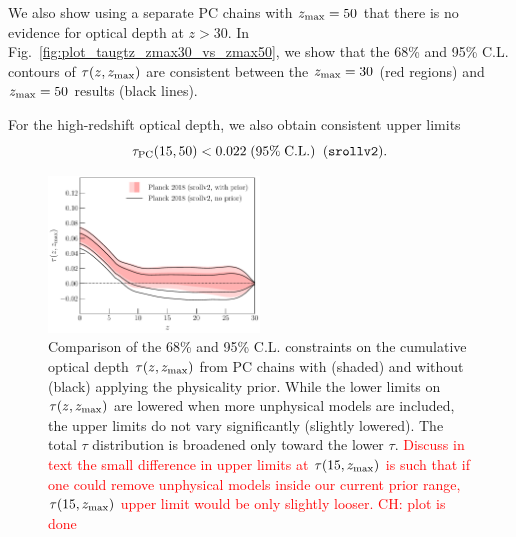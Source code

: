 \documentclass[prd,twocolumn,amsmath,amssymb,floatfix,superscriptaddress,nofootinbib]{revtex4-1}
\newcommand{\zmax}{z_{\rm max}}
\newcommand{\beq}{\begin{equation}}
\newcommand{\eeq}{\end{equation}}
\newcommand{\ch}[1]{\textcolor{red}{#1}}
\begin{document}
We also show using a separate PC chains with $\zmax = 50$ that there is no evidence for optical depth at $z>30$. 
In Fig.~\ref{fig:plot_taugtz_zmax30_vs_zmax50}, we show that the 68\% and 95\% C.L. contours of $\tau(z, \zmax)$ are consistent between the $\zmax = 30$ (red regions) and $\zmax = 50$ results (black lines).

%
%

For the high-redshift optical depth, we also obtain consistent upper limits
\beq
\tau_{\rm PC}(15, 50) < 0.022 \; (95\%\; \mathrm{C.L.})\;\;(\texttt{srollv2}).
\eeq

\begin{figure}[ht]
\includegraphics[width=0.5\textwidth]{paper/plots/pl18_taugtz_pc_zmax30_pl18_srollv2_with_and_without_physicality_prior.pdf}
\caption{Comparison of the 68\% and 95\% C.L. constraints on the cumulative optical depth $\tau(z, \zmax)$ from PC chains with (shaded) and without (black) applying the physicality prior. While the lower limits on $\tau(z, \zmax)$ are lowered when more unphysical models are included, the upper limits do not vary significantly (slightly lowered).  The total $\tau$ distribution is broadened only toward the lower $\tau$. \ch{Discuss in text the small difference in upper limits at $\tau(15, \zmax)$ is such that if one could remove unphysical models inside our current prior range, $\tau(15, \zmax)$ upper limit would be only slightly looser.} \ch{CH: plot is done}
}
%
\label{fig:plot_taugtz_2018_with_vs_without_physicality_prior}
\end{figure}
\end{document}
